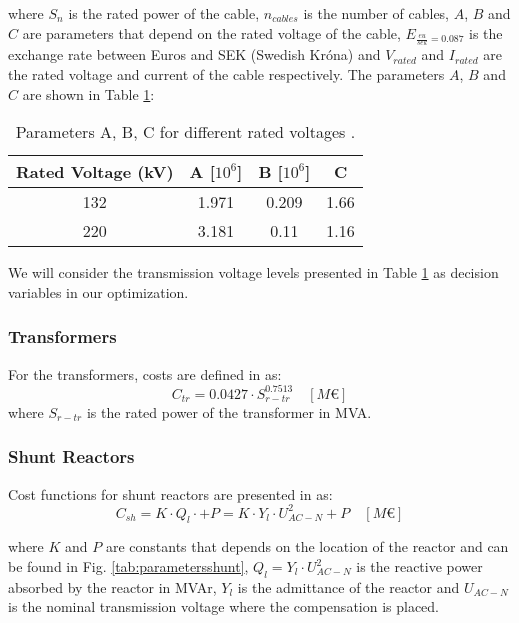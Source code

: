 \documentclass[a4paper,11pt, titlepage, twoside]{article}
\begin{document}
where $S_n$ is the rated power of the cable, $n_{cables}$ is the number of cables, $A$, $B$ and $C$ are parameters that depend on the rated voltage of the cable, $E_{\frac{eu}{sek}=0.087}$ is the exchange rate between Euros and SEK (Swedish Króna) and $V_{rated}$ and $I_{rated}$ are the rated voltage and current of the cable respectively.
The parameters $A$, $B$ and $C$ are shown in Table \ref{tab:parameterscab}:
\begin{table}[H]
    \centering
    \begin{tabular}{c|c|c|c}
    \hline
    \textbf{Rated Voltage (kV)} & \textbf{A [$10^6$]} & \textbf{B [$10^6$]} & \textbf{C} \\
    \hline
    132 & 1.971 & 0.209 & 1.66 \\
    220 & 3.181 & 0.11 & 1.16 \\
    \hline
    \end{tabular}
    \caption{Parameters A, B, C for different rated voltages \cite{chalmers}.}
    \label{tab:parameterscab}
    \end{table}
We will consider the transmission voltage levels presented in Table \ref{tab:parameterscab} as decision variables in our optimization.


\subsubsection{Transformers}
For the transformers, costs are defined in \cite{costraf} as:
\begin{equation}
    C_{tr}= 0.0427 \cdot S_{r-tr}^{0.7513} \quad \left[M\euro\right]
\end{equation}
where $S_{r-tr}$ is the rated power of the transformer in MVA.

\subsubsection{Shunt Reactors}
Cost functions for shunt reactors are presented in \cite{paperbase} as:
\begin{equation}\label{eq:shuntcost}
    C_{sh}= K \cdot Q_l \cdot + P = K \cdot Y_l\cdot U_{AC-N}^2 + P \quad \left[M\euro\right]
\end{equation}

where $K$ and $P$ are constants that depends on the location of the reactor and can be found in Fig. \ref{tab:parametersshunt}, $Q_l = Y_l\cdot U_{AC-N}^2$ is the reactive power absorbed by the reactor in MVAr,
$Y_l$ is the admittance of the reactor and $U_{AC-N}$ is the nominal transmission voltage where the compensation is placed.
\end{document}
